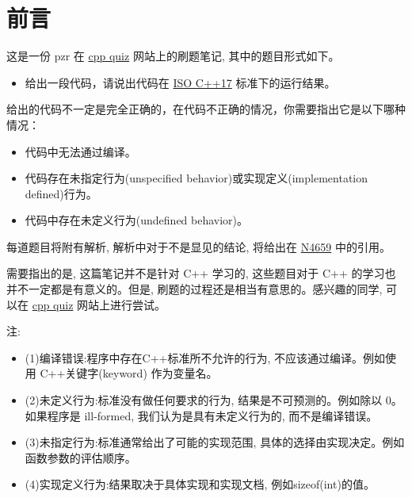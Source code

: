 \documentclass{article}
\begin{document}
\section{前言}
这是一份 pzr 在 \href{https://cppquiz.org}{cpp quiz} 网站上的刷题笔记, 其中的题目形式如下。

\begin{itemize}
	\item 给出一段代码，请说出代码在 	\href{https://www.iso.org/standard/68564.html}{ISO C++17}
	标准下的运行结果。
\end{itemize}

给出的代码不一定是完全正确的，在代码不正确的情况，你需要指出它是以下哪种情况：

\begin{itemize}
	\item 代码中无法通过编译。
	\item 代码存在未指定行为(unspecified behavior)或实现定义(implementation defined)行为。
	\item 代码中存在未定义行为(undefined behavior)。
\end{itemize}

每道题目将附有解析, 解析中对于不是显见的结论, 将给出在 \href{https://github.com/cplusplus/draft/blob/main/papers/n4659.pdf}{N4659} 中的引用。

需要指出的是, 这篇笔记并不是针对 C++ 学习的, 这些题目对于 C++ 的学习也并不一定都是有意义的。但是, 刷题的过程还是相当有意思的。感兴趣的同学, 可以在 \href{https://cppquiz.org}{cpp quiz} 网站上进行尝试。

注:
\begin{itemize}
	\item (1)编译错误:程序中存在C++标准所不允许的行为, 不应该通过编译。例如使用 C++关键字(keyword) 作为变量名。
	\item (2)未定义行为:标准没有做任何要求的行为, 结果是不可预测的。例如除以 0。如果程序是 ill-formed, 我们认为是具有未定义行为的, 而不是编译错误。
	\item (3)未指定行为:标准通常给出了可能的实现范围, 具体的选择由实现决定。例如函数参数的评估顺序。
	\item (4)实现定义行为:结果取决于具体实现和实现文档, 例如sizeof(int)的值。
\end{itemize}
\end{document}
